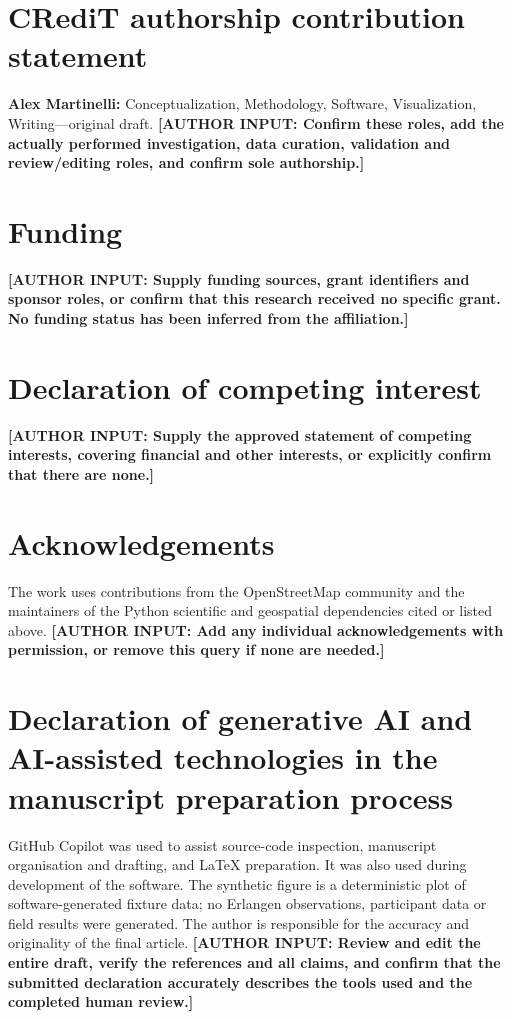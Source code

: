 \documentclass[preprint,12pt,a4paper]{elsarticle}
\newcommand{\AuthorQuery}[1]{\textcolor{red!65!black}{\textbf{[AUTHOR INPUT: #1]}}}
\begin{document}
\section*{CRediT authorship contribution statement}
\textbf{Alex Martinelli:} Conceptualization, Methodology, Software,
Visualization, Writing---original draft.
\AuthorQuery{Confirm these roles, add the actually performed investigation,
data curation, validation and review/editing roles, and confirm sole authorship.}

\section*{Funding}
\AuthorQuery{Supply funding sources, grant identifiers and sponsor roles, or
confirm that this research received no specific grant. No funding status has
been inferred from the affiliation.}

\section*{Declaration of competing interest}
\AuthorQuery{Supply the approved statement of competing interests, covering
financial and other interests, or explicitly confirm that there are none.}

\section*{Acknowledgements}
The work uses contributions from the OpenStreetMap community and the
maintainers of the Python scientific and geospatial dependencies cited or
listed above. \AuthorQuery{Add any individual acknowledgements with permission,
or remove this query if none are needed.}

\section*{Declaration of generative AI and AI-assisted technologies in the manuscript preparation process}
GitHub Copilot was used to assist source-code inspection, manuscript
organisation and drafting, and LaTeX preparation. It was also used during
development of the software. The synthetic figure is a deterministic plot of
software-generated fixture data; no Erlangen observations, participant data or
field results were generated. The author is responsible for the accuracy and
originality of the final article.
\AuthorQuery{Review and edit the entire draft, verify the references and all
claims, and confirm that the submitted declaration accurately describes the
tools used and the completed human review.}
\end{document}
